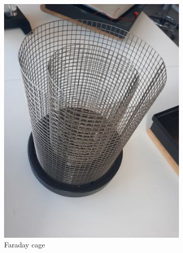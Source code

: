 \begin{figure}[H]
\begin{subfigure}[b]{0.33\textwidth}
        \includegraphics[width=\textwidth]{capacitors/img/setup/cage.jpg}
        \caption{Faraday cage}
    \end{subfigure}
    \begin{subfigure}[b]{0.33\textwidth}
        \centering

\end{subfigure}
\end{figure}
